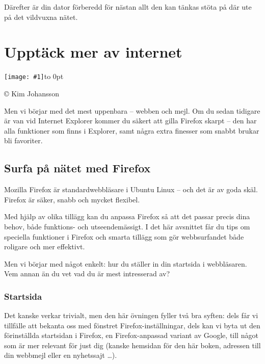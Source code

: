 \documentclass[a4paper,final]{memoir} %
\newcommand{\xrcredit}[1]{\hbox to 0pt{\hspace*{.6\baselineskip}\begin{rotate}{90}{\usefont{T1}{phv}{m}{n}\selectfont\tiny #1}\end{rotate}}}
\newcommand\xintropic[1]{{\texttt{[image: \#1]}\xrcredit{\copyright{} Kim Johansson}}\medskip}
\newcommand\xchapter[2]{\chapter{#2}\begin{center}\xintropic{#1}\end{center}}
\begin{document}
Därefter är din dator förberedd för nästan allt den kan tänkas stöta på där ute på det vildvuxna nätet.



\xchapter{bilder804-all/Upptack_mer_internett}{Upptäck mer av internet}\label{cha:internet}



Men vi börjar med det mest uppenbara -- webben och mejl. Om du sedan tidigare är van vid Internet Explorer kommer du säkert att gilla Firefox skarpt -- den har alla funktioner som finns i Explorer, samt några extra finesser som snabbt brukar bli favoriter.

\section{Surfa på nätet med Firefox}



Mozilla Firefox är standardwebbläsare i Ubuntu Linux -- och det är av goda skäl. Firefox är säker, snabb och mycket flexibel. %

Med hjälp av olika tillägg kan du anpassa Firefox så att det passar precis dina behov, både funktions- och utseendemässigt.  I det här avsnittet får du tips om speciella funktioner i Firefox och smarta tillägg som gör webbsurfandet både roligare och mer effektivt.

Men vi börjar med något enkelt: hur du ställer in din startsida i webbläsaren. Vem annan än du vet vad du är mest intresserad av?

\subsection{Startsida}


Det kanske verkar trivialt, men den här övningen fyller två bra syften: dels får vi tillfälle att bekanta oss med fönstret Firefox-inställningar, dels kan vi byta ut den förinställda startsidan i Firefox, en Firefox-anpassad variant av Google, till något som är mer relevant för just dig (kanske hemsidan för den här boken, adressen till din webbmejl eller en nyhetssajt \ldots{}).
\end{document}
